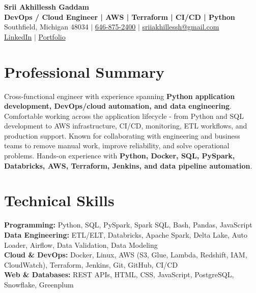 \documentclass[letterpaper,10pt]{article}
\begin{document}
\fontsize{9.35pt}{10.45pt}\selectfont

\begin{center}
    {\LARGE \textbf{Srii Akhillessh Gaddam}} \\[-1pt]
    \textbf{DevOps / Cloud Engineer | AWS | Terraform | CI/CD | Python} \\[2pt]
    Southfield, Michigan 48034 $|$
    \href{tel:6468752400}{646-875-2400} $|$
    \href{mailto:sriiakhillessh@gmail.com}{sriiakhillessh@gmail.com} \\[1pt]
    \href{https://www.linkedin.com/in/srii-akhiilessh-gaddam-b48668191/}{LinkedIn} $|$
    \href{https://sriiakhillesshg.github.io/portfolio/}{Portfolio}
\end{center}
\vspace{-8pt}

\section{Professional Summary}
\small{Cross-functional engineer with experience spanning \textbf{Python application development, DevOps/cloud automation, and data engineering}. Comfortable working across the application lifecycle - from Python and SQL development to AWS infrastructure, CI/CD, monitoring, ETL workflows, and production support. Known for collaborating with engineering and business teams to remove manual work, improve reliability, and solve operational problems. Hands-on experience with \textbf{Python, Docker, SQL, PySpark, Databricks, AWS, Terraform, Jenkins, and data pipeline automation}.}

\section{Technical Skills}
\small{
\textbf{Programming:} Python, SQL, PySpark, Spark SQL, Bash, Pandas, JavaScript \\
\textbf{Data Engineering:} ETL/ELT, Databricks, Apache Spark, Delta Lake, Auto Loader, Airflow, Data Validation, Data Modeling \\
\textbf{Cloud \& DevOps:} Docker, Linux, AWS (S3, Glue, Lambda, Redshift, IAM, CloudWatch), Terraform, Jenkins, Git, GitHub, CI/CD \\
\textbf{Web \& Databases:} REST APIs, HTML, CSS, JavaScript, PostgreSQL, Snowflake, Greenplum
}
\end{document}
